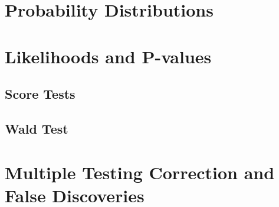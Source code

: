 \documentclass{pset}
\date{6/1/2025}
\begin{document}
\maketitle

\section{Probability Distributions}

\subsection{}

\subsection{}

\subsection{}


\section{Likelihoods and P-values}

\subsection{Score Tests}


\subsection{Wald Test}


\section{Multiple Testing Correction and False Discoveries}

\subsection{}

\subsection{}

\subsection{}
\end{document}
